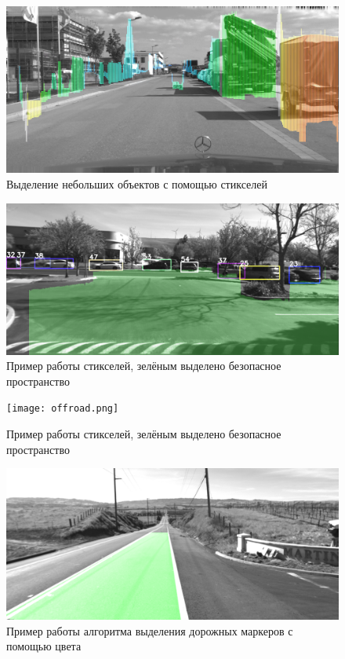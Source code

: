 \documentclass[aps,%
14pt,%
final,%
oneside,
onecolumn,%
musixtex, %
superscriptaddress,%
centertags]{extarticle} %
\begin{document}
\begin{figure}[]
     \includegraphics[width=\textwidth]{small_object.png}
     \caption{Выделение небольших объектов с помощью стикселей }
     \label{fig:small}
\end{figure}
\begin{figure}[]
     \includegraphics[width=\textwidth]{onroad.png}
     \caption{Пример работы стикселей, зелёным выделено безопасное пространство }
     \label{fig:stix_onroad}
\end{figure}
\begin{figure}[]
     \texttt{[image: offroad.png]}
     \caption{Пример работы стикселей, зелёным выделено безопасное пространство }
     \label{fig:stix_offroad}
\end{figure}
\begin{figure}[]
     \includegraphics[width=\textwidth]{324.png}
     \caption{Пример работы алгоритма выделения дорожных маркеров с помощью цвета }
     \label{fig:color_markers}
\end{figure}
\end{document}
